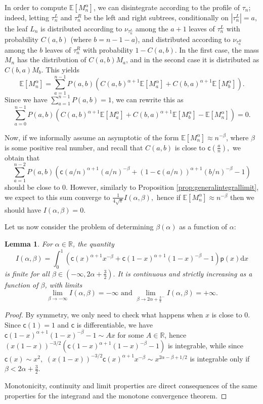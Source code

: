 \documentclass[11pt]{article}
\newcommand{\pp}{\mathsf{p}}
\newcommand{\cc}{\mathsf{c}}
\newcommand{\ff}{\cc}
\newcommand{\E}{\mathbb{E}}
\newcommand{\R}{{\mathbb{R}}}
\newcommand{\dd}{\mathrm{d}}
\newtheorem{lem}[thm]{Lemma}
\begin{document}
In order to compute $\E[M_n^\alpha]$, we can disintegrate according to the profile of $\tau_n$; indeed, letting $\tau_n^L$ and $\tau_n^R$ be the left and right subtrees, conditionally on $|\tau_n^L|=a$, the leaf $L_n$ is distributed according to $\nu_{\tau_n^L}$ among the $a+1$ leaves of $\tau_n^L$ with probability $C(a,b)$ (where $b=n-1-a$), and distributed according to $\nu_{\tau_n^R}$  among the $b$ leaves of $\tau_n^R$ with probability $1-C(a,b)$. In the first case, the mass $M_n$ has the distribution of $C(a,b)M_a$, and in the second case it is distributed as $C(b,a)M_{b}$. This yields
\[\E[M_n^\alpha]=\sum_{a=1}^{n-1}P(a,b)\left(C(a,b)^{\alpha+1}\E[M_a^\alpha]+C(b,a)^{\alpha+1}\E[M_b^\alpha]\right).\]
Since we have $\sum_{a=1}^{n-1}P(a,b)=1$, we can rewrite this as
\[\sum_{a=0}^{n-1}P(a,b)\left(C(a,b)^{\alpha+1} \E[M_a^\alpha]+C(b,a)^{\alpha+1} \E[M_b^\alpha]-\E[M_n^\alpha]\right)=0.\]

Now, if we informally assume an asymptotic of the form $\E[M_n^\alpha] \approx n^{-\beta}$, where $\beta$ is some positive real number, and recall that $C(a,b)$ is close to $\ff(\frac{a}{n}),$ we obtain that
\[\sum_{a=1}^{n-2}P(a,b)\left(\ff(a/n)^{\alpha+1} (a/n)^{-\beta}+\left(1-\ff(a/n)\right)^{\alpha+1} \left(b/n\right)^{-\beta}-1\right)\]
should be close to $0$. However, similarly to Proposition \ref{prop:generalintegrallimit}, we expect to this sum converge to $\frac{1}{4\sqrt{\pi}} I(\alpha,\beta),$ hence if $\E[M_n^\alpha] \approx n^{-\beta}$ then we should have $I(\alpha,\beta)=0$.

Let us now consider the problem of determining $\beta(\alpha)$ as a function of $\alpha$:
\begin{lem}
For $\alpha\in\R$, the quantity
\[I(\alpha,\beta)=\int_0^1 \left(\ff(x)^{\alpha+1} x^{-\beta}+\ff(1-x)^{\alpha+1} (1-x)^{-\beta}-1\right)\pp(x)\dd x\]
is finite for all $\beta \in (-\infty,2\alpha+\frac{3}{2}).$ It is continuous and strictly increasing as a function of $\beta$, with limits
$$\lim_{\beta\to -\infty}I(\alpha,\beta)=-\infty\mbox{ and }\lim_{\beta\to2\alpha+\frac{3}{2}^-}I(\alpha,\beta)=+\infty.$$
\end{lem}

\begin{proof}
By symmetry, we only need to check what happens when $x$ is close to $0$. Since $\ff(1)=1$ and $\ff$ is differentiable, we have $\ff(1-x)^{\alpha+1} (1-x)^{-\beta}-1 \sim Ax$ for some $A\in\R$, hence $(x(1-x))^{-3/2}(\ff(1-x)^{\alpha+1} (1-x)^{-\beta}-1)$ is integrable, while since $\ff(x)\sim x^2,$ $(x(1-x))^{-3/2}\ff(x)^{\alpha+1}x^{-\beta}\sim x^{2\alpha-\beta+1/2}$ is integrable only if $\beta<2\alpha+\frac{3}{2}.$

Monotonicity, continuity and limit properties are direct consequences of the same properties for the integrand and the monotone convergence theorem.
\end{proof}
\end{document}
